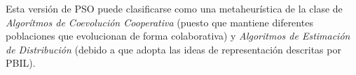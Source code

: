 Esta versión de PSO puede clasificarse como una metaheurística de la clase de \emph{Algorítmos de Coevolución Cooperativa} \cite{Derrac:2009:FSU:1574827.1574906} (puesto que mantiene diferentes poblaciones que evolucionan de forma colaborativa) y \emph{Algoritmos de Estimación de Distribución} (debido a que adopta las ideas de representación descritas por PBIL).
